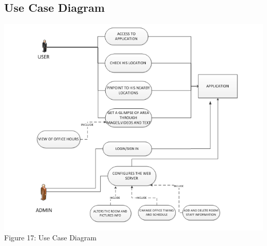 \documentclass{article}
\begin{document}
\subsection{Use Case Diagram}
\begin{center}
\includegraphics[scale=0.8]{usecase}
\\Figure 17: Use Case Diagram
\end{center}
\end{document}
